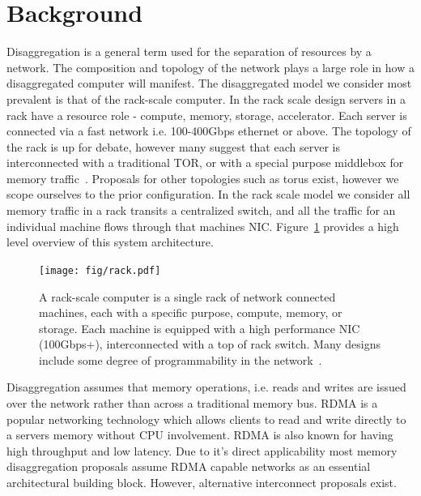 
\section{Background}


Disaggregation is a general term used for the separation of resources by a
network. The composition and topology of the network plays a large role in how a
disaggregated computer will manifest. The disaggregated model we consider most
prevalent is that of the rack-scale computer. In the rack scale design servers
in a rack have a resource role - compute, memory, storage, accelerator. Each
server is connected via a fast network i.e. 100-400Gbps ethernet or above. The
topology of the rack is up for debate, however many suggest that each server is
interconnected with a traditional TOR, or with a special purpose middlebox for
memory traffic~\cite{disandapp}. Proposals for other topologies such as torus
exist, however we scope ourselves to the prior configuration. In the rack scale
model we consider all memory traffic in a rack transits a centralized switch,
and all the traffic for an individual machine flows through that machines NIC.
Figure~\ref{fig:rackscale} provides a high level overview of this system
architecture.

\begin{figure}
    \begin{centering}
    \texttt{[image: fig/rack.pdf]}
    \caption{ A rack-scale computer is a single rack of network connected
    machines, each with a specific purpose, compute, memory, or storage. Each
    machine is equipped with a high performance NIC (100Gbps+), interconnected
    with a top of rack switch. Many designs include some degree of
    programmability in the network~\cite{disandapp}.
    }
    \label{fig:rackscale}
    \end{centering}
\end{figure}


Disaggregation assumes that memory operations, i.e. reads and writes are issued
over the network rather than across a traditional memory bus. RDMA is a popular
networking technology which allows clients to read and write directly to a
servers memory without CPU involvement. RDMA is also known for having high
throughput and low latency. Due to it's direct applicability most memory
disaggregation proposals assume RDMA capable networks as an essential
architectural building block. However, alternative interconnect proposals exist.

